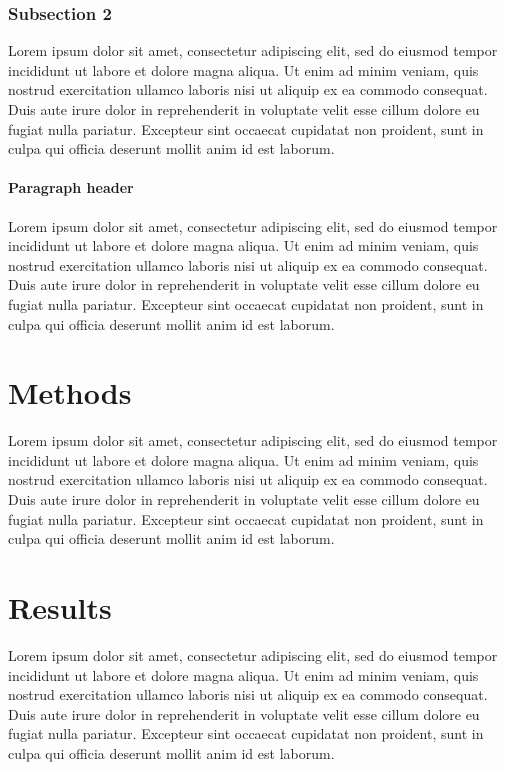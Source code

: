 \documentclass[nogrid]{MBE}%
\begin{document}
\subsubsection{Subsection 2}

Lorem ipsum dolor sit amet, consectetur adipiscing elit, sed do eiusmod tempor incididunt ut labore et dolore magna aliqua. Ut enim ad minim veniam, quis nostrud exercitation ullamco laboris nisi ut aliquip ex ea commodo consequat. Duis aute irure dolor in reprehenderit in voluptate velit esse cillum dolore eu fugiat nulla pariatur. Excepteur sint occaecat cupidatat non proident, sunt in culpa qui officia deserunt mollit anim id est laborum.


\paragraph{Paragraph header} 

Lorem ipsum dolor sit amet, consectetur adipiscing elit, sed do eiusmod tempor incididunt ut labore et dolore magna aliqua. Ut enim ad minim veniam, quis nostrud exercitation ullamco laboris nisi ut aliquip ex ea commodo consequat. Duis aute irure dolor in reprehenderit in voluptate velit esse cillum dolore eu fugiat nulla pariatur. Excepteur sint occaecat cupidatat non proident, sunt in culpa qui officia deserunt mollit anim id est laborum.

\section{{Methods}\label{sec:Methods}}

Lorem ipsum dolor sit amet, consectetur adipiscing elit, sed do eiusmod tempor incididunt ut labore et dolore magna aliqua. Ut enim ad minim veniam, quis nostrud exercitation ullamco laboris nisi ut aliquip ex ea commodo consequat. Duis aute irure dolor in reprehenderit in voluptate velit esse cillum dolore eu fugiat nulla pariatur. Excepteur sint occaecat cupidatat non proident, sunt in culpa qui officia deserunt mollit anim id est laborum.

\section{{Results}\label{sec:Results}}

Lorem ipsum dolor sit amet, consectetur adipiscing elit, sed do eiusmod tempor incididunt ut labore et dolore magna aliqua. Ut enim ad minim veniam, quis nostrud exercitation ullamco laboris nisi ut aliquip ex ea commodo consequat. Duis aute irure dolor in reprehenderit in voluptate velit esse cillum dolore eu fugiat nulla pariatur. Excepteur sint occaecat cupidatat non proident, sunt in culpa qui officia deserunt mollit anim id est laborum.
\end{document}
